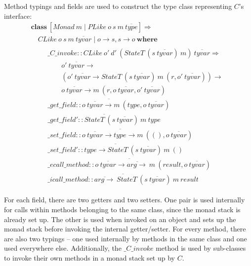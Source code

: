 Method typings and fields are used to construct the type class representing $C$'s interface: 
\begin{displaymath}
\begin{array}{l}
\mathbf{class}~[\mathit{Monad}~m \mid \mathit{PLike}~o~s~m~\overline{\mathit{type}}] \Rightarrow \\
\quad \mathit{CLike}~o~s~m~\overline{\mathit{tyvar}} \mid o \to s, s \to o~\mathbf{where} \\
\qquad \begin{array}{l}
\_\mathit{C}\_\mathit{invoke} :: \mathit{CLike}~o'~d'~(\mathit{StateT}~(s~\overline{\mathit{tyvar}})~m)~\overline{\mathit{tyvar}} \Rightarrow \\
\qquad o'~\overline{\mathit{tyvar}} \to \\ \qquad (o'~\overline{\mathit{tyvar}} \to \mathit{StateT}~(s~\overline{\mathit{tyvar}})~m~(r,o'~\overline{\mathit{tyvar}})) \to\\\qquad
o~\overline{\mathit{tyvar}} \to m~(r,o~\overline{\mathit{tyvar}},o'~\overline{\mathit{tyvar}}) \\
\overline{\_\mathit{get}\_\mathit{field} :: o~\overline{\mathit{tyvar}} \to m~(\mathit{type}, o~\overline{\mathit{tyvar}}) } \\
\overline{\_\mathit{get}\_\mathit{field}' :: \mathit{StateT}~(s~\overline{\mathit{tyvar}})~m~\mathit{type}} \\
\overline{\_\mathit{set}\_\mathit{field} :: o~\overline{\mathit{tyvar}} \to \mathit{type} \to m~((),o~\overline{\mathit{tyvar}})} \\
\overline{\_\mathit{set}\_\mathit{field}' :: \mathit{type} \to \mathit{StateT}~(s~\overline{\mathit{tyvar}})~m~()} \\
\overline{\mathit{\_ecall\_method} :: o~\overline{\mathit{tyvar}} \to \overline{\mathit{arg} \to}~m~(\mathit{result},o~\overline{\mathit{tyvar}})}\\
\overline{\_\mathit{icall\_method} :: \overline{\mathit{arg} \to}~ \mathit{StateT}~(s~\overline{\mathit{tyvar}})~m~\mathit{result} }
\end{array}
\end{array}
\end{displaymath}

For each field, there are two getters and two setters. One pair is used internally for calls within methods belonging to the same class, since the monad stack is already set up. The other is used when invoked on an object and sets up the monad stack before invoking the internal getter/setter. For every method, there are also two typings -- one used internally by methods in the same class and one used everywhere else. Additionally, the $\_\mathit{C}\_\mathit{invoke}$ method is used by sub-classes to invoke their own methods in a monad stack set up by $C$.

